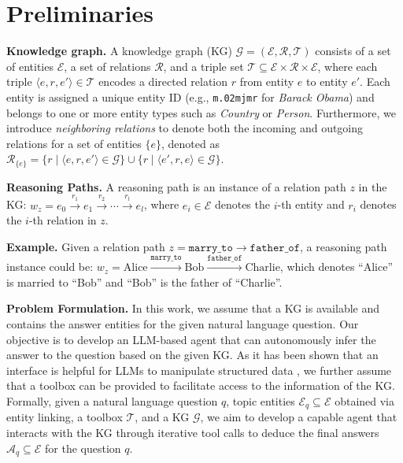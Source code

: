 \section{Preliminaries}

\textbf{Knowledge graph.}
A knowledge graph (KG) $\mathcal{G} = (\mathcal{E}, \mathcal{R}, \mathcal{T})$ 
consists of a set of entities $\mathcal{E}$, a set of relations 
$\mathcal{R}$, and a triple set $\mathcal{T} \subseteq \mathcal{E} 
\times \mathcal{R} \times \mathcal{E}$, where each triple 
$\langle e, r, e' \rangle \in \mathcal{T}$ encodes a directed 
relation $r$ from entity $e$ to entity $e'$. Each entity is 
assigned a unique entity ID (e.g., \texttt{m.02mjmr} for 
\emph{Barack Obama}) and belongs to one or more entity types 
such as \emph{Country} or \emph{Person}.
Furthermore, we introduce \textit{neighboring relations} to denote both the incoming and outgoing relations for a set of entities $\{e\}$, denoted as $\mathcal{R}_{\{e\}} = \{r \mid \langle e, r, e' \rangle \in \mathcal{G}\} \cup \{r \mid \langle e', r, e \rangle \in \mathcal{G}\}$.

\textbf{Reasoning Paths.}
A reasoning path is an instance of a relation path $z$ in the 
KG: $w_z = e_0 \xrightarrow{r_1} e_1 \xrightarrow{r_2} \cdots 
\xrightarrow{r_l} e_l$, where $e_i \in \mathcal{E}$ denotes the 
$i$-th entity and $r_i$ denotes the $i$-th relation in $z$.

\textbf{Example.} Given a relation path 
$z = \texttt{marry\_to} \rightarrow \texttt{father\_of}$, 
a reasoning path instance could be:
$w_z = \text{Alice} \xrightarrow{\texttt{marry\_to}} 
\text{Bob} \xrightarrow{\texttt{father\_of}} \text{Charlie}$, which denotes ``Alice'' is married to ``Bob'' and ``Bob'' is the father of ``Charlie''.

\textbf{Problem Formulation.} In this work, we assume that a KG is available and contains the answer entities for the given natural language question. Our objective is to develop an LLM-based agent that can autonomously infer the answer to the question based on the given KG. As it has been shown that an interface is helpful for LLMs to manipulate structured data \citep{jiang2023structgpt}, we further assume that a toolbox can be provided to facilitate access to the information of the KG. Formally, given a natural language question $q$, topic entities $\mathcal{E}_q \subseteq \mathcal{E}$ obtained via entity linking, a toolbox $\mathcal{T}$, and a KG $\mathcal{G}$, we aim to develop a capable agent that interacts with the KG through iterative tool calls \citep{yao2023reactsynergizingreasoningacting, jiang2025kg, Xiong_2024} to deduce the final answers $\widehat{\mathcal{A}}_q \subseteq \mathcal{E}$ for the question $q$.